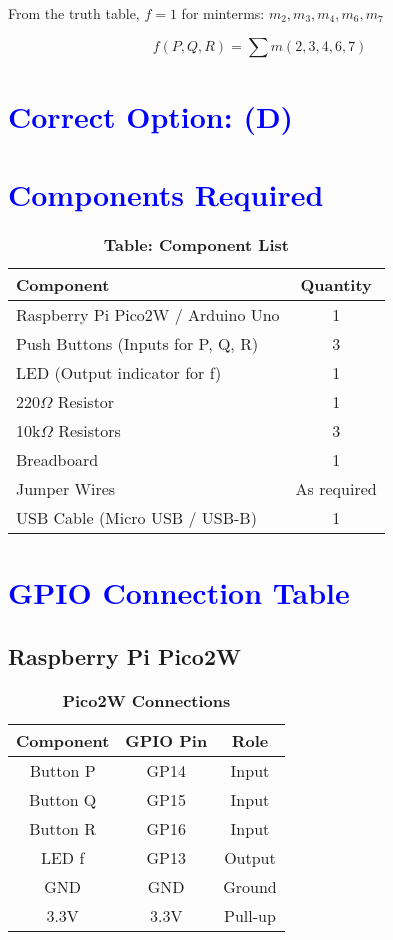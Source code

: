 \documentclass[twocolumn]{article}
\begin{document}
From the truth table, \( f = 1 \) for minterms: \( m_2, m_3, m_4, m_6, m_7 \)

\[
f(P, Q, R) = \sum m(2, 3, 4, 6, 7)
\]

\section*{\textcolor{blue}{Correct Option: (D)}}

\vspace{1em}

\section*{\textcolor{blue}{Components Required}}

\begin{table}[h]
\centering
\renewcommand{\arraystretch}{1.2}
\begin{tabular}{|>{\raggedright}p{5cm}|c|}
\hline
\textbf{Component} & \textbf{Quantity} \\
\hline
Raspberry Pi Pico2W / Arduino Uno & 1 \\
Push Buttons (Inputs for P, Q, R) & 3 \\
LED (Output indicator for f) & 1 \\
220$\Omega$ Resistor & 1 \\
10k$\Omega$ Resistors & 3 \\
Breadboard & 1 \\
Jumper Wires & As required \\
USB Cable (Micro USB / USB-B) & 1 \\
\hline
\end{tabular}
\caption*{\textbf{Table: Component List}}
\end{table}

\section*{\textcolor{blue}{GPIO Connection Table}}

\subsection*{Raspberry Pi Pico2W}

\begin{table}[h]
\centering
\begin{tabular}{|c|c|c|}
\hline
Component & GPIO Pin & Role \\
\hline
Button P & GP14 & Input \\
Button Q & GP15 & Input \\
Button R & GP16 & Input \\
LED f    & GP13 & Output \\
GND      & GND  & Ground \\
3.3V     & 3.3V & Pull-up \\
\hline
\end{tabular}
\caption*{\textbf{Pico2W Connections}}
\end{table}
\end{document}
